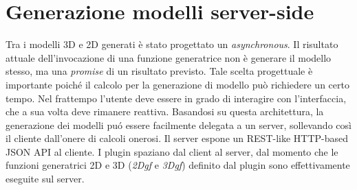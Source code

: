 \section{Generazione modelli server-side}
\label{sec:chapter_3_section_4}

\noindent
Tra i modelli 3D e 2D generati è stato progettato un \emph{asynchronous}.
Il risultato attuale dell'invocazione di una funzione generatrice non \`e generare il modello stesso,
ma una \emph{promise} di un risultato previsto. Tale scelta progettuale \`e importante poich\'e il calcolo per la
generazione di modello pu\`o richiedere un certo tempo.
Nel frattempo l'utente deve essere in grado di interagire con l'interfaccia, che a sua volta deve rimanere reattiva.
Basandosi su questa architettura, la generazione dei modelli pu\'o essere facilmente delegata a un server,
sollevando così il cliente dall'onere di calcoli onerosi. Il server espone un REST-like HTTP-based JSON API al cliente.
I plugin spaziano dal client al server, dal momento che le funzioni generatrici 2D e 3D (\emph{2Dgf} e \emph{3Dgf})
 definito dal plugin sono effettivamente eseguite sul server.


